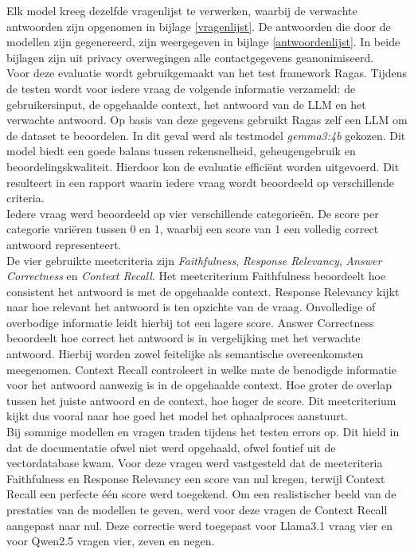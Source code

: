 Elk model kreeg dezelfde vragenlijst te verwerken, waarbij de verwachte antwoorden zijn opgenomen in bijlage \ref{vragenlijst}.
De antwoorden die door de modellen zijn gegenereerd, zijn weergegeven in bijlage \ref{antwoordenlijst}.
In beide bijlagen zijn uit privacy overwegingen alle contactgegevens geanonimiseerd.
\\[1em]
Voor deze evaluatie wordt gebruikgemaakt van het test framework Ragas. Tijdens de testen wordt voor iedere vraag de volgende informatie verzameld: de gebruikersinput, de opgehaalde context, het antwoord van de LLM en het verwachte antwoord. Op basis van deze gegevens gebruikt Ragas zelf een LLM om de dataset te beoordelen. In dit geval werd als testmodel \textit{gemma3:4b} gekozen. Dit model biedt een goede balans tussen rekensnelheid, geheugengebruik en beoordelingskwaliteit. Hierdoor kon de evaluatie efficiënt worden uitgevoerd. Dit resulteert in een rapport waarin iedere vraag wordt beoordeeld op verschillende criteria.
\\[1em]
Iedere vraag werd beoordeeld op vier verschillende categorieën. De score per categorie variëren tussen 0 en 1, waarbij een score van 1 een volledig correct antwoord representeert.
\\[1em]
De vier gebruikte meetcriteria zijn \textit{Faithfulness}, \textit{Response Relevancy}, \textit{Answer Correctness} en \textit{Context Recall}. Het meetcriterium Faithfulness beoordeelt hoe consistent het antwoord is met de opgehaalde context. Response Relevancy kijkt naar hoe relevant het antwoord is ten opzichte van de vraag. Onvolledige of overbodige informatie leidt hierbij tot een lagere score. Answer Correctness beoordeelt hoe correct het antwoord is in vergelijking met het verwachte antwoord. Hierbij worden zowel feitelijke als semantische overeenkomsten meegenomen. Context Recall controleert in welke mate de benodigde informatie voor het antwoord aanwezig is in de opgehaalde context. Hoe groter de overlap tussen het juiste antwoord en de context, hoe hoger de score. Dit meetcriterium kijkt dus vooral naar hoe goed het model het ophaalproces aanstuurt.
\\[1em]
Bij sommige modellen en vragen traden tijdens het testen errors op. Dit hield in dat de documentatie ofwel niet werd opgehaald, ofwel foutief uit de vectordatabase kwam. Voor deze vragen werd vastgesteld dat de meetcriteria Faithfulness en Response Relevancy een score van nul kregen, terwijl Context Recall een perfecte één score werd toegekend. Om een realistischer beeld van de prestaties van de modellen te geven, werd voor deze vragen de Context Recall aangepast naar nul. Deze correctie werd toegepast voor Llama3.1 vraag vier en voor Qwen2.5 vragen vier, zeven en negen.
